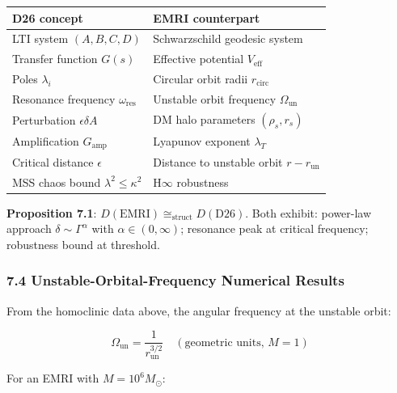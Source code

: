 \documentclass[
]{article}
\newcounter{none} %
\begin{document}
{\def\LTcaptype{none} %
\begin{longtable}[]{@{}
  >{\raggedright\arraybackslash}p{}
  >{\raggedright\arraybackslash}p{}@{}}
\toprule\noalign{}
\begin{minipage}[b]{\linewidth}\raggedright
D26 concept
\end{minipage} & \begin{minipage}[b]{\linewidth}\raggedright
EMRI counterpart
\end{minipage} \\
\midrule\noalign{}
\endhead
\bottomrule\noalign{}
\endlastfoot
LTI system \((A,B,C,D)\) & Schwarzschild geodesic system \\
Transfer function \(G(s)\) & Effective potential \(V_{\text{eff}}\) \\
Poles \(\lambda_i\) & Circular orbit radii \(r_{\text{circ}}\) \\
Resonance frequency \(\omega_{\text{res}}\) & Unstable orbit frequency
\(\Omega_{\text{un}}\) \\
Perturbation \(\epsilon \delta A\) & DM halo parameters
\((\rho_s, r_s)\) \\
Amplification \(G_{\text{amp}}\) & Lyapunov exponent \(\lambda_T\) \\
Critical distance \(\epsilon\) & Distance to unstable orbit
\(r - r_{\text{un}}\) \\
MSS chaos bound \(\lambda^2 \leq \kappa^2\) & H\(\infty\) robustness \\
\end{longtable}
}

\textbf{Proposition 7.1}:
\(D(\text{EMRI}) \cong_{\text{struct}} D(\text{D26})\). Both exhibit:
power-law approach \(\delta \sim \Gamma^\alpha\) with
\(\alpha \in (0, \infty)\); resonance peak at critical frequency;
robustness bound at threshold.

\subsubsection{7.4 Unstable-Orbital-Frequency Numerical
Results}\label{unstable-orbital-frequency-numerical-results}

From the homoclinic data above, the angular frequency at the unstable
orbit:

\[\Omega_{\text{un}} = \frac{1}{r_{\text{un}}^{3/2}} \quad (\text{geometric units, } M = 1)\]

For an EMRI with \(M = 10^6 M_\odot\):
\end{document}

